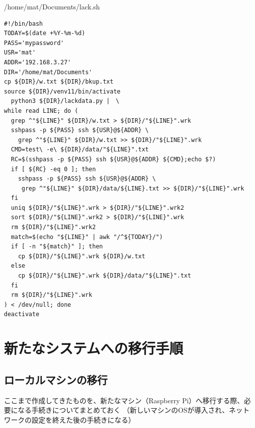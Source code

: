 \documentclass[12pt,a4paper,uplatex]{jsarticle}
\begin{document}
\begin{itembox}[l]{/home/mat/Documents/lack.sh}
	\begin{verbatim}
#!/bin/bash
TODAY=$(date +%Y-%m-%d)
PASS='mypassword'
USR='mat'
ADDR='192.168.3.27'
DIR='/home/mat/Documents'
cp ${DIR}/w.txt ${DIR}/bkup.txt
source ${DIR}/venv11/bin/activate
  python3 ${DIR}/lackdata.py |　\
while read LINE; do (
  grep ^"${LINE}" ${DIR}/w.txt > ${DIR}/"${LINE}".wrk
  sshpass -p ${PASS} ssh ${USR}@${ADDR} \
    grep ^"${LINE}" ${DIR}/w.txt >> ${DIR}/"${LINE}".wrk
  CMD=test\ -e\ ${DIR}/data/"${LINE}".txt
  RC=$(sshpass -p ${PASS} ssh ${USR}@${ADDR} ${CMD};echo $?)
  if [ ${RC} -eq 0 ]; then
    sshpass -p ${PASS} ssh ${USR}@${ADDR} \
     grep ^"${LINE}" ${DIR}/data/${LINE}.txt >> ${DIR}/"${LINE}".wrk
  fi
  uniq ${DIR}/"${LINE}".wrk > ${DIR}/"${LINE}".wrk2
  sort ${DIR}/"${LINE}".wrk2 > ${DIR}/"${LINE}".wrk
  rm ${DIR}/"${LINE}".wrk2
  match=$(echo "${LINE}" | awk "/^${TODAY}/")
  if [ -n "${match}" ]; then
    cp ${DIR}/"${LINE}".wrk ${DIR}/w.txt
  else
    cp ${DIR}/"${LINE}".wrk ${DIR}/data/"${LINE}".txt
  fi
  rm ${DIR}/"${LINE}".wrk
) < /dev/null; done
deactivate
	\end{verbatim}
\end{itembox}

\newpage

\section{新たなシステムへの移行手順}

\subsection{ローカルマシンの移行}

ここまで作成してきたものを、新たなマシン（Raspberry Pi）へ移行する際、必要になる手続きについてまとめておく
（新しいマシンのOSが導入され、ネットワークの設定を終えた後の手続きになる）
\end{document}
